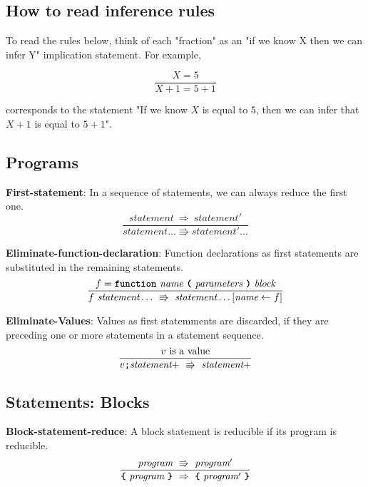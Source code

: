 \subsection*{How to read inference rules}

To read the rules below, think of each "fraction" as an
"if we know X then we can infer Y" implication statement.
For example,

\[
\frac{
  X = 5
}{
  X + 1 = 5 + 1
}
\]

corresponds to the statement
"If we know $X$ is equal to $5$,
then we can infer that $X + 1$ is equal to $5 + 1$".


\subsection*{Programs}


\textbf{First-statement}: In a sequence of statements, we can always
reduce the first one.
\[
\frac{
  \textit{statement}\ \Rightarrow\ \textit{statement}'
}{  
  \textit{statement} \ldots
  \Rrightarrow 
  \textit{statement}' \ldots
}
\]

\vspace{10mm}

\textbf{Eliminate-function-declaration}: Function declarations as first
statements are substituted in the remaining statements.
\[
\frac{
             f = \textbf{\texttt{function}}\  \textit{name} \ 
                 \textbf{\texttt{(}}\  \textit{parameters}
                 \ \textbf{\texttt{)}}\ \textit{block}
}{
f\ \textit{statement} \ldots\ 
  \Rrightarrow\ 
  \textit{statement} \ldots[\textit{name} \leftarrow f]
}
\]

\vspace{10mm}
\textbf{Eliminate-Values}: Values as first statemments are discarded, if
they are preceding one or more statements in a statement sequence.
\[
\frac{
v \ \mbox{is a value}  
}{
v \textbf{\texttt{;}} \textit{statement}+\ 
   \Rrightarrow  \ 
  \textit{statement}+
}
\]

\subsection*{Statements: Blocks}

\textbf{Block-statement-reduce}: A block statement is
reducible if its program is reducible.
\[
\frac{
  \textit{program} 
\ \Rrightarrow \ 
  \textit{program}'
}{  
  \textbf{\texttt{\{}} \
  \textit{program} \ 
  \textbf{\texttt{\}}}
\  \Rightarrow \ 
  \textbf{\texttt{\{}} \
  \textit{program}' \ 
  \textbf{\texttt{\}}}
}
\]

